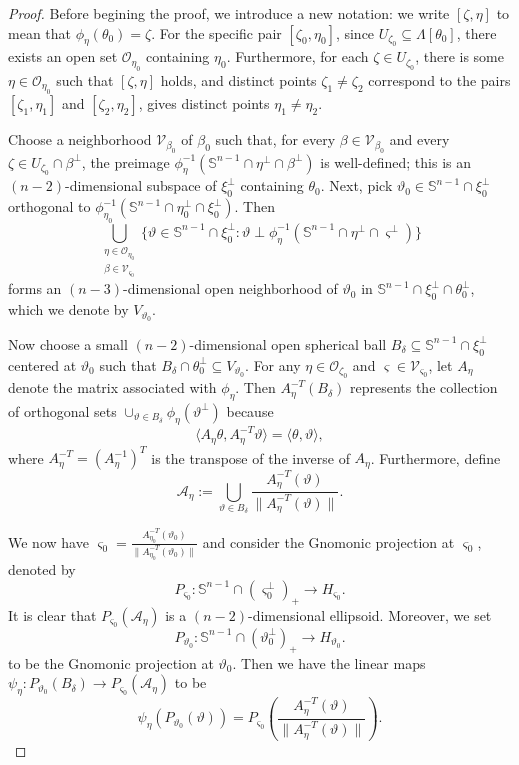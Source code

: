 \documentclass[amsfonts,reqno,11pt]{amsart}
\newcommand{\sphere}{\mathbb{S}^{n-1}}
\begin{document}
\begin{proof}
 Before begining the proof, we introduce a new notation: we write $[\zeta,\eta]$ to mean that $\phi_\eta(\theta_0)=\zeta$. For the specific pair $[\zeta_0,\eta_0]$, since $U_{\zeta_0} \subseteq \Lambda[\theta_0]$, there exists an open set $\mathcal{O}_{\eta_0}$ containing $\eta_0$. Furthermore, for each $\zeta \in U_{\zeta_0}$, there is some $\eta \in \mathcal{O}_{\eta_0}$ such that $[\zeta,\eta]$ holds, and distinct points $\zeta_1 \neq \zeta_2$ correspond to the pairs $[\zeta_1,\eta_1]$ and $[\zeta_2,\eta_2]$, gives distinct points $\eta_1 \neq \eta_2$.

    Choose a neighborhood $\mathcal{V}_{\beta_0}$ of $\beta_0$ such that, for every $\beta\in\mathcal{V}_{\beta_0}$ and every $\zeta\in U_{\zeta_0}\cap \beta^\perp$, the preimage $\phi_\eta^{-1}(\sphere\cap \eta^\perp\cap \beta^\perp)$ is well-defined; this is an $(n-2)$-dimensional subspace of $\xi_0^\perp$ containing $\theta_0$. Next, pick $\vartheta_0\in\sphere\cap\xi_0^\perp$ orthogonal to $\phi_{\eta_0}^{-1}(\sphere\cap \eta_0^\perp\cap \xi_0^\perp)$. Then
$$
\bigcup_{\substack{\eta\in\mathcal{O}_{\eta_0} \\ \beta\in\mathcal{V}_{\varsigma_0}}}\{\vartheta\in \sphere\cap \xi_0^\perp: \vartheta\perp\phi_\eta^{-1}(\sphere\cap \eta^\perp\cap \varsigma^\perp)\}
$$
forms an $(n-3)$-dimensional open neighborhood of $\vartheta_0$ in $\sphere\cap\xi_0^\perp\cap\theta_0^\perp$, which we denote by $V_{\vartheta_0}$.

    Now choose a small $(n-2)$-dimensional open spherical ball $B_{\delta}\subseteq \sphere\cap\xi_0^\perp$ centered at $\vartheta_0$ such that $B_{\delta}\cap \theta_0^\perp \subseteq V_{\vartheta_0}$. For any $\eta\in \mathcal{O}_{\zeta_0}$ and $\varsigma\in\mathcal{V}_{\varsigma_0}$, let $A_{\eta}$ denote the matrix associated with $\phi_\eta$. Then $A_\eta^{-T}(B_\delta)$ represents the collection of orthogonal sets $\cup_{\vartheta\in B_{\delta}}\phi_\eta(\vartheta^\perp)$ because
$$
\langle A_\eta \theta, A_\eta^{-T}\vartheta\rangle= \langle \theta, \vartheta \rangle,
$$
where $A_\eta^{-T}=(A_\eta^{-1})^T$ is the transpose of the inverse of $A_\eta$. Furthermore, define
$$
\mathcal{A}_\eta:=\bigcup_{\vartheta\in B_{\delta}}\frac{A_\eta^{-T}(\vartheta)}{\|A_\eta^{-T}(\vartheta)\|}.
$$

    We now have $\varsigma_0=\frac{A_{\eta_0}^{-T}(\vartheta_0)}{\|A_{\eta_0}^{-T}(\vartheta_0)\|}$ and consider the Gnomonic projection at $\varsigma_0$, denoted by 
    $$
    P_{\varsigma_0}: \sphere\cap (\varsigma_0^\perp)_+\to H_{\varsigma_0}.
    $$
    It is clear that $P_{\varsigma_0}(\mathcal{A}_\eta)$ is a $(n-2)$-dimensional ellipsoid. Moreover, we set
    $$
    P_{\vartheta_0}: \sphere\cap (\vartheta_0^\perp)_+\to H_{\vartheta_0}.
    $$
    to be the Gnomonic projection at $\vartheta_0$. Then we have the linear maps $\psi_{\eta}:P_{\vartheta_0}(B_\delta)\to P_{\varsigma_0}(\mathcal{A}_\eta)$ to be
    \[
    \psi_{\eta}(P_{\vartheta_0}(\vartheta))=P_{\varsigma_0}\left(\frac{A_\eta^{-T}(\vartheta)}{\|A_\eta^{-T}(\vartheta)\|}\right).
    \]


\end{proof}
\end{document}
